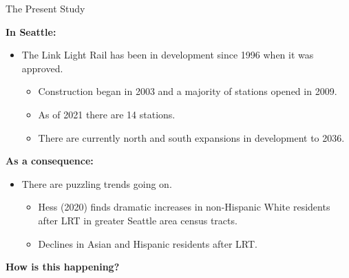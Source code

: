 \documentclass[11pt,ignorenonframetext,]{beamer}
\providecommand{\tightlist}{%
  \setlength{\itemsep}{0pt}\setlength{\parskip}{0pt}}
\begin{document}
\begin{frame}{The Present Study}
\protect\hypertarget{the-present-study}{}

\textbf{In Seattle:}

\begin{itemize}
\tightlist
\item
  The Link Light Rail has been in development since 1996 when it was
  approved.

  \begin{itemize}
  \tightlist
  \item
    Construction began in 2003 and a majority of stations opened in
    2009.
  \item
    As of 2021 there are 14 stations.
  \item
    There are currently north and south expansions in development to
    2036.
  \end{itemize}
\end{itemize}

\textbf{As a consequence:}

\begin{itemize}
\tightlist
\item
  There are puzzling trends going on.

  \begin{itemize}
  \tightlist
  \item
    Hess (2020) finds dramatic increases in non-Hispanic White residents
    after LRT in greater Seattle area census tracts.
  \item
    Declines in Asian and Hispanic residents after LRT.
  \end{itemize}
\end{itemize}

\textbf{How is this happening?}

\end{frame}
\end{document}

